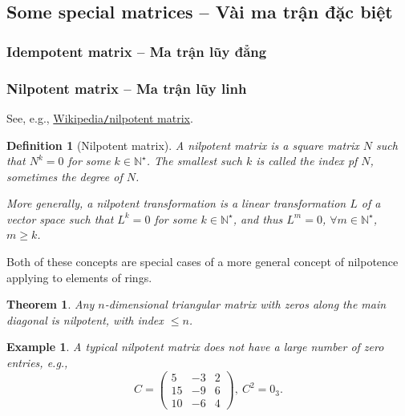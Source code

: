 \documentclass{article}
\newtheorem{definition}{Definition}
\newtheorem{example}{Example}
\newtheorem{theorem}{Theorem}
\begin{document}
\subsection{Some special matrices -- Vài ma trận đặc biệt}


\subsubsection{Idempotent matrix -- Ma trận lũy đẳng}


\subsubsection{Nilpotent matrix -- Ma trận lũy linh}
See, e.g., \href{https://en.wikipedia.org/wiki/Nilpotent_matrix}{Wikipedia{\tt/}nilpotent matrix}.

\begin{definition}[Nilpotent matrix]
	A {\rm nilpotent matrix} is a square matrix $N$ such that $N^k = 0$ for some $k\in\mathbb{N}^\star$. The smallest such $k$ is called the {\rm index} pf $N$, sometimes the {\rm degree} of $N$.
	
	More generally, a {\rm nilpotent transformation} is a linear transformation $L$ of a vector space such that $L^k = 0$ for some $k\in\mathbb{N}^\star$, and thus $L^m = 0$, $\forall m\in\mathbb{N}^\star$, $m\ge k$.
\end{definition}
Both of these concepts are special cases of a more general concept of nilpotence applying to elements of rings.

\begin{theorem}
	Any $n$-dimensional triangular matrix with zeros along the main diagonal is nilpotent, with index $\le n$.
\end{theorem}

\begin{example}
	A typical nilpotent matrix does not have a large number of zero entries, e.g.,
	\begin{equation*}
		C = \begin{pmatrix}
			5 & -3 & 2\\15 & -9 & 6\\10 & -6 & 4
		\end{pmatrix},\ C^2 = 0_3.
	\end{equation*}
\end{example}
\end{document}
